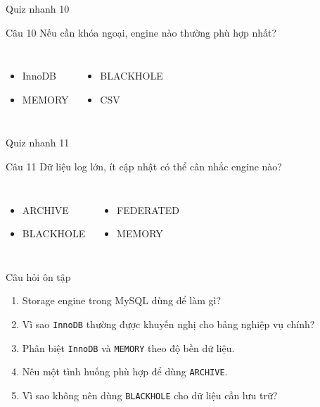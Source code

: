 \documentclass[aspectratio=169,11pt]{beamer}
\newcommand{\code}[1]{\texttt{#1}}
\newcommand{\smallitem}{\setlength{\itemsep}{2pt}}
\begin{document}
\begin{frame}{Quiz nhanh 10}
\begin{block}{Câu 10}
Nếu cần khóa ngoại, engine nào thường phù hợp nhất?
\end{block}
\vspace{0.2cm}
\begin{columns}[T,onlytextwidth]
\begin{itemize}\smallitem
  \item[A.] InnoDB
  \item[B.] MEMORY
\end{itemize}
\begin{itemize}\smallitem
  \item[C.] BLACKHOLE
  \item[D.] CSV
\end{itemize}
\end{columns}
\end{frame}

\begin{frame}{Quiz nhanh 11}
\begin{block}{Câu 11}
Dữ liệu log lớn, ít cập nhật có thể cân nhắc engine nào?
\end{block}
\vspace{0.2cm}
\begin{columns}[T,onlytextwidth]
\begin{itemize}\smallitem
  \item[A.] ARCHIVE
  \item[B.] BLACKHOLE
\end{itemize}
\begin{itemize}\smallitem
  \item[C.] FEDERATED
  \item[D.] MEMORY
\end{itemize}
\end{columns}
\end{frame}

\begin{frame}{Câu hỏi ôn tập}
\begin{enumerate}\smallitem
  \item Storage engine trong MySQL dùng để làm gì?
  \item Vì sao \code{InnoDB} thường được khuyến nghị cho bảng nghiệp vụ chính?
  \item Phân biệt \code{InnoDB} và \code{MEMORY} theo độ bền dữ liệu.
  \item Nêu một tình huống phù hợp để dùng \code{ARCHIVE}.
  \item Vì sao không nên dùng \code{BLACKHOLE} cho dữ liệu cần lưu trữ?
\end{enumerate}
\end{frame}
\end{document}
